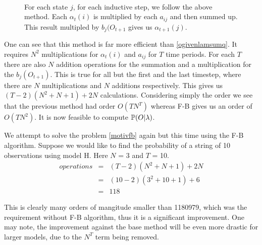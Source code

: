 \begin{figure}
	\begin{center}
        \\
    For each state $j$, for each inductive step, we follow the above method. Each $\alpha_t(i)$ is multiplied by each $a_{ij}$ and then summed up. This result multipled by $b_j(O_{t+1}$ gives us $\alpha_{t+1}(j)$.
    \end{center}
\end{figure}



One can see that this method is far more efficient than \ref{ogivenlamsumq}. It requires $N^2$ multiplications for  $\alpha_t(i)$ and $a_{ij}$  for $T$ time periods. For each $T$ there are also $N$ addition operations for the summation and a multiplication for the $b_j(O_{t+1})$. This is true for all but the first and the last timestep, where there are $N$ multiplications and $N$ additions respectively. This gives us $(T-2)(N^2 + N + 1) + 2N$ calculations. Considering simply the order we see that the previous method had order $O(TN^T)$ whereas F-B gives us an order of $O(TN^2)$. It is now feasible to compute $\mathbb{P} (O | \lambda)$.

\begin{example}
    \label{motivfb}
    We attempt to solve the problem \ref{motivfb} again but this time using the F-B algorithm. Suppose we would like to find the probability of a string of 10 observations using model H. Here $N$ = 3 and $T$ = 10. 
    \begin{eqnarray}
        operations & = & (T-2)(N^2 + N + 1) + 2N \\
                   & = & (10-2)(3^2 + 10 + 1) + 6\\
                   & = & 118
    \end{eqnarray}

    This is clearly many orders of mangitude smaller than 1180979, which was the requirement without F-B algorithm, thus it is a significant improvement. One may note, the improvement against the base method will be even more drastic for larger models, due to the $N^T$ term being removed.  
\end{example}


